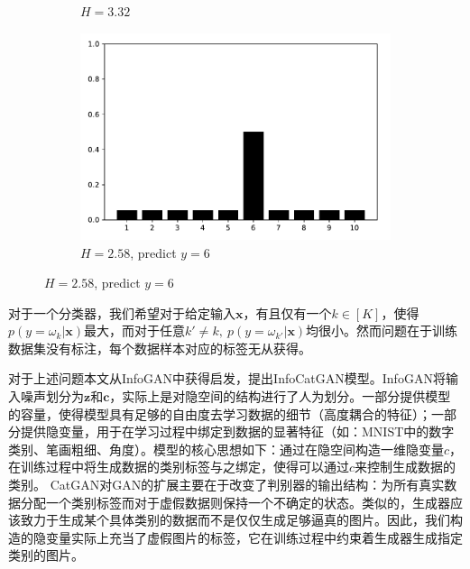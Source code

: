 \begin{figure}[htbp]
\begin{subfigure}[b]{\trif\textwidth}
    \caption{$H = 3.32$}
  \end{subfigure}
  \begin{subfigure}[b]{\trif\textwidth}
    \includegraphics[width=\textwidth]{Img/entc.pdf}
    \caption{$H = 2.58$, predict $y=6$}
  \end{subfigure}
  \label{fig:ent}
\end{figure}
对于一个分类器，我们希望对于给定输入$\mathbf{x}$，有且仅有一个$k \in [K]$，使得$p(y=\omega_k|\mathbf{x})$最大，而对于任意$k' \neq k, ~p(y=\omega_{k'}|\mathbf{x})$均很小。然而问题在于训练数据集没有标注，每个数据样本对应的标签无从获得。

对于上述问题本文从InfoGAN中获得启发，提出InfoCatGAN模型。InfoGAN将输入噪声划分为$\mathbf{z}$和$\mathbf{c}$，实际上是对隐空间的结构进行了人为划分。一部分提供模型的容量，使得模型具有足够的自由度去学习数据的细节（高度耦合的特征）；一部分提供隐变量，用于在学习过程中绑定到数据的显著特征（如：MNIST中的数字类别、笔画粗细、角度）。模型的核心思想如下：通过在隐空间构造一维隐变量$c$，在训练过程中将生成数据的类别标签与之绑定，使得可以通过$c$来控制生成数据的类别。
CatGAN对GAN的扩展主要在于改变了判别器的输出结构：为所有真实数据分配一个类别标签而对于虚假数据则保持一个不确定的状态。类似的，生成器应该致力于生成某个具体类别的数据而不是仅仅生成足够逼真的图片。因此，我们构造的隐变量实际上充当了虚假图片的标签，它在训练过程中约束着生成器生成指定类别的图片。

